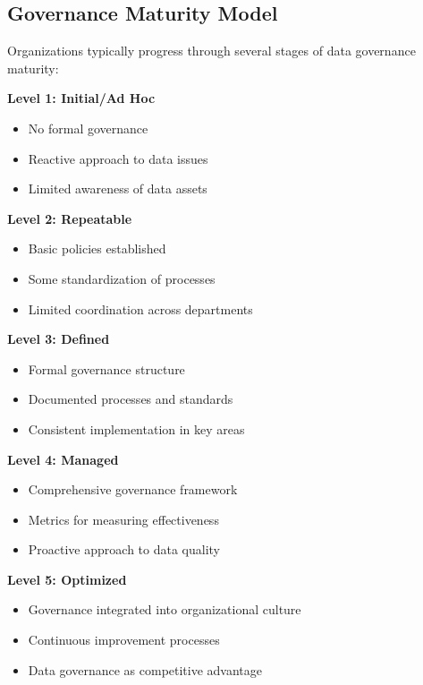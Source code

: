 \documentclass[12pt]{article}
\begin{document}
\subsection{Governance Maturity Model}
\begin{tcolorbox}[colback=blue!5!white,colframe=blue!75!black,title={Data Governance Maturity Levels}]
Organizations typically progress through several stages of data governance maturity:

\textbf{Level 1: Initial/Ad Hoc}
\begin{itemize}
    \item No formal governance
    \item Reactive approach to data issues
    \item Limited awareness of data assets
\end{itemize}

\textbf{Level 2: Repeatable}
\begin{itemize}
    \item Basic policies established
    \item Some standardization of processes
    \item Limited coordination across departments
\end{itemize}

\textbf{Level 3: Defined}
\begin{itemize}
    \item Formal governance structure
    \item Documented processes and standards
    \item Consistent implementation in key areas
\end{itemize}

\textbf{Level 4: Managed}
\begin{itemize}
    \item Comprehensive governance framework
    \item Metrics for measuring effectiveness
    \item Proactive approach to data quality
\end{itemize}

\textbf{Level 5: Optimized}
\begin{itemize}
    \item Governance integrated into organizational culture
    \item Continuous improvement processes
    \item Data governance as competitive advantage
\end{itemize}
\end{tcolorbox}
\end{document}
